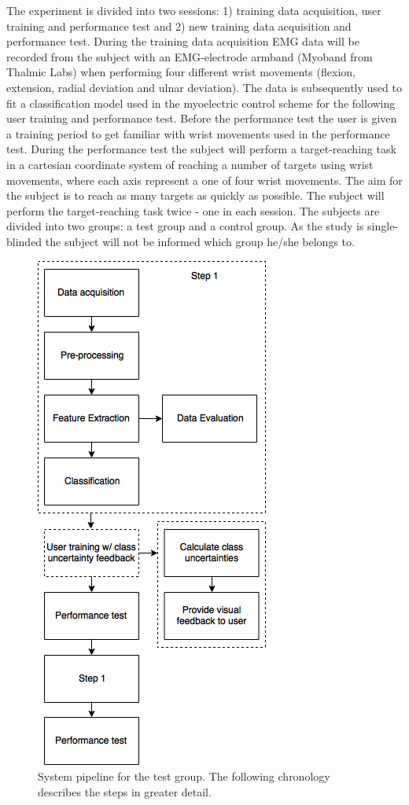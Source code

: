 The experiment is divided into two sessions: 1) training data acquisition, user training and performance test and 2) new training data acquisition and performance test. During the training data acquisition EMG data will be recorded from the subject with an EMG-electrode armband (Myoband from Thalmic Labs) when performing four different wrist movements (flexion, extension, radial deviation and ulnar deviation). The data is subsequently used to fit a classification model used in the myoelectric control scheme for the following user training and performance test. Before the performance test the user is given a training period to get familiar with wrist movements used in the performance test. During the performance test the subject will perform a target-reaching task in a cartesian coordinate system of reaching a number of targets using wrist movements, where each axis represent a one of four wrist movements. The aim for the subject is to reach as many targets as quickly as possible. The subject will perform the target-reaching task twice - one in each session. The subjects are divided into two groups: a test group and a control group. As the study is single-blinded the subject will not be informed which group he/she belongs to.

\begin{figure}[H]                                         
	\includegraphics[width=.4\textwidth]{figures/sStatusSeminar/systemPepeLineTG}  
	\caption{System pipeline for the test group. The following chronology describes the steps in greater detail.}
	\label{fig:sysPipeTG} 
\end{figure} 


